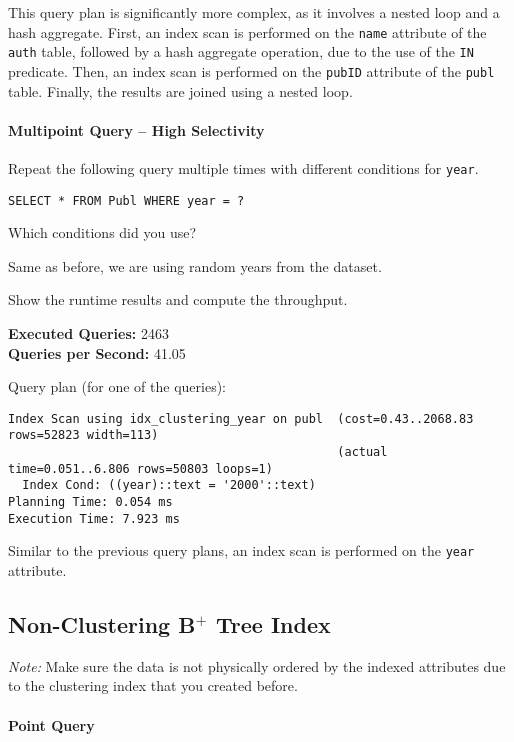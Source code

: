 \documentclass[11pt]{scrartcl}
\begin{document}
This query plan is significantly more complex, as it involves a nested loop and a hash aggregate.
First, an index scan is performed on the \texttt{name} attribute of the \texttt{auth} table, followed by a hash aggregate
operation, due to the use of the \texttt{IN} predicate.
Then, an index scan is performed on the \texttt{pubID} attribute of the \texttt{publ} table.
Finally, the results are joined using a nested loop.

\paragraph{Multipoint Query -- High Selectivity}

Repeat the following query multiple times with different conditions for \texttt{year}.

\begin{lstlisting}[style=dbtsql]
SELECT * FROM Publ WHERE year = ?
\end{lstlisting}

Which conditions did you use?

Same as before, we are using random years from the dataset.

Show the runtime results and compute the throughput.

\textbf{Executed Queries: } 2463\\
\textbf{Queries per Second: } 41.05

Query plan (for one of the queries):

{\small
\parskip0pt\begin{verbatim}
Index Scan using idx_clustering_year on publ  (cost=0.43..2068.83 rows=52823 width=113)
                                              (actual time=0.051..6.806 rows=50803 loops=1)
  Index Cond: ((year)::text = '2000'::text)
Planning Time: 0.054 ms
Execution Time: 7.923 ms
\end{verbatim}}
Similar to the previous query plans, an index scan is performed on the \texttt{year} attribute.

\subsection*{Non-Clustering B$^+$ Tree Index}

\emph{Note:} Make sure the data is not physically ordered by the indexed attributes due to the clustering index that you created before.

\paragraph{Point Query}
\end{document}
